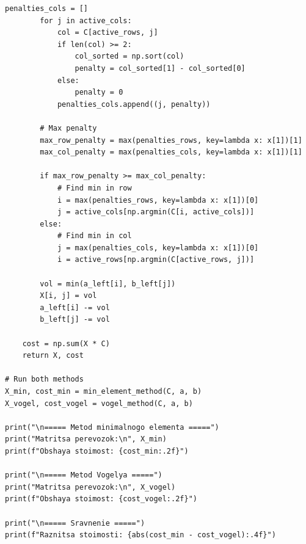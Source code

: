 \documentclass[a4paper, final]{article}
\begin{document}
\begin{lstlisting}[caption={Решение транспортной задачи методами минимального элемента и Фогеля}, label=lst:code]
        penalties_cols = []
        for j in active_cols:
            col = C[active_rows, j]
            if len(col) >= 2:
                col_sorted = np.sort(col)
                penalty = col_sorted[1] - col_sorted[0]
            else:
                penalty = 0
            penalties_cols.append((j, penalty))
        
        # Max penalty
        max_row_penalty = max(penalties_rows, key=lambda x: x[1])[1]
        max_col_penalty = max(penalties_cols, key=lambda x: x[1])[1]
        
        if max_row_penalty >= max_col_penalty:
            # Find min in row
            i = max(penalties_rows, key=lambda x: x[1])[0]
            j = active_cols[np.argmin(C[i, active_cols])]
        else:
            # Find min in col
            j = max(penalties_cols, key=lambda x: x[1])[0]
            i = active_rows[np.argmin(C[active_rows, j])]
        
        vol = min(a_left[i], b_left[j])
        X[i, j] = vol
        a_left[i] -= vol
        b_left[j] -= vol
    
    cost = np.sum(X * C)
    return X, cost

# Run both methods
X_min, cost_min = min_element_method(C, a, b)
X_vogel, cost_vogel = vogel_method(C, a, b)

print("\n===== Metod minimalnogo elementa =====")
print("Matritsa perevozok:\n", X_min)
print(f"Obshaya stoimost: {cost_min:.2f}")

print("\n===== Metod Vogelya =====")
print("Matritsa perevozok:\n", X_vogel)
print(f"Obshaya stoimost: {cost_vogel:.2f}")

print("\n===== Sravnenie =====")
print(f"Raznitsa stoimosti: {abs(cost_min - cost_vogel):.4f}")
\end{lstlisting}
\end{document}

